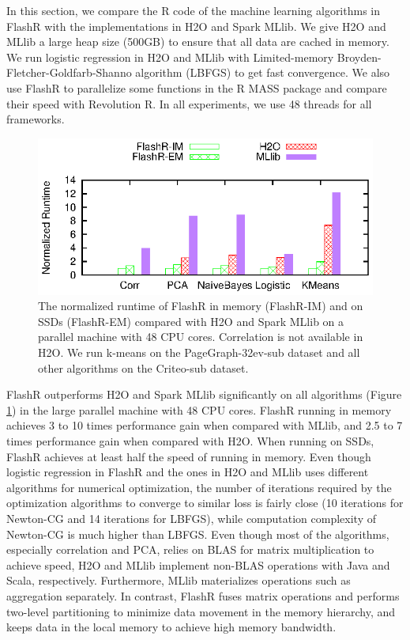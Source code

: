 In this section, we compare the R code of the machine learning algorithms
in FlashR with the implementations in H2O and Spark MLlib.
We give H2O and MLlib a large heap size (500GB) to ensure that all data are
cached in memory. We run logistic regression in H2O and MLlib with Limited-memory
Broyden-Fletcher-Goldfarb-Shanno algorithm (LBFGS) \cite{lbfgs} to get fast
convergence. We also use FlashR to parallelize some functions in the R
MASS package and compare their speed with Revolution R. In all experiments,
we use 48 threads for all frameworks.

\begin{figure}
  \vspace{-5pt}
	\centering
	\footnotesize
	\includegraphics{FlashMatrix_figs/FlashR-vs-dist.eps}
	\vspace{-8pt}
	\caption{The normalized runtime of FlashR in memory (FlashR-IM) and
	on SSDs (FlashR-EM) compared with H2O and Spark MLlib on a parallel machine
	with 48 CPU cores. Correlation is not available in H2O. We run k-means on
	the PageGraph-32ev-sub dataset and all other algorithms on the Criteo-sub
	dataset.}
	\label{perf:rt}
  \vspace{-10pt}
\end{figure}

FlashR outperforms H2O and Spark MLlib significantly on all algorithms
(Figure \ref{perf:rt}) in the large parallel machine with 48 CPU cores.
FlashR running in memory achieves 3 to 10 times performance gain when compared
with MLlib, and 2.5 to 7 times performance gain when compared with H2O.
When running on SSDs, FlashR achieves at least half the speed of running in
memory. Even though logistic regression in FlashR and the ones in H2O and MLlib
uses different algorithms for numerical optimization, the number of iterations
required by the optimization algorithms to converge to similar loss is fairly
close (10 iterations for Newton-CG and 14 iterations for LBFGS), while computation
complexity of Newton-CG is much higher than LBFGS.
Even though most of the algorithms, especially correlation and PCA,
relies on BLAS for matrix multiplication to achieve speed, H2O and MLlib
implement non-BLAS operations with Java and Scala, respectively. Furthermore,
MLlib materializes operations such as aggregation separately. In contrast,
FlashR fuses matrix operations and performs two-level partitioning to
minimize data movement in the memory hierarchy, and keeps data in the local
memory to achieve high memory bandwidth.

